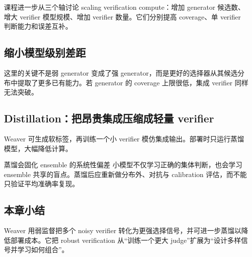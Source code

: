 \documentclass[a4paper]{article}
\begin{document}

课程进一步从三个轴讨论 scaling verification compute：增加 generator 候选数、增大 verifier 模型规模、增加 verifier 数量。它们分别提高 coverage、单 verifier 判断能力和误差互补。


\subsection{缩小模型级别差距}


这里的关键不是弱 generator 变成了强 generator，而是更好的选择器从其候选分布中提取了更多已有能力。若 generator 的 coverage 上限很低，集成 verifier 同样无法突破。

\subsection{Distillation：把昂贵集成压缩成轻量 verifier}

Weaver 可生成软标签，再训练一个小 verifier 模仿集成输出。部署时只运行蒸馏模型，大幅降低计算。



\begin{warningbox}{蒸馏会固化 ensemble 的系统性偏差}
小模型不仅学习正确的集体判断，也会学习 ensemble 共享的盲点。蒸馏后应重新做分布外、对抗与 calibration 评估，而不能只验证平均准确率复现。
\end{warningbox}

\subsection{本章小结}

Weaver 用弱监督把多个 noisy verifier 转化为更强选择信号，并可进一步蒸馏以降低部署成本。它把 robust verification 从“训练一个更大 judge”扩展为“设计多样信号并学习如何组合”。
\end{document}
